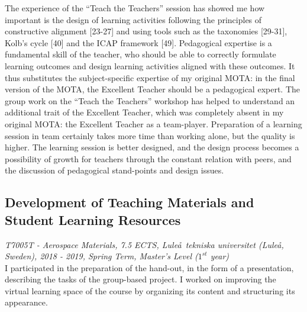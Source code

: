 \documentclass[
  a4paper, 
]{fortysecondscv}
\begin{document}
The experience of the “Teach the Teachers” session has showed me how important is the design of learning activities following the principles of constructive alignment [23-27] and using tools such as the taxonomies [29-31], Kolb’s cycle [40] and the ICAP framework [49]. Pedagogical expertise is a fundamental skill of the teacher, who should be able to correctly formulate learning outcomes and design learning activities aligned with these outcomes. It thus substitutes the subject-specific expertise of my original MOTA: in the final version of the MOTA, the Excellent Teacher should be a pedagogical expert. The group work on the “Teach the Teachers” workshop has helped to understand an additional trait of the Excellent Teacher, which was completely absent in my original MOTA: the Excellent Teacher as a team-player. Preparation of a learning session in team certainly takes more time than working alone, but the quality is higher. The learning session is better designed, and the design process becomes a possibility of growth for teachers through the constant relation with peers, and the discussion of pedagogical stand-points and design issues.

\newpage
\makebacksidebar
\hrulefill\hspace{5pt}\textbf{\thepage}

\subsection{Development of Teaching Materials and Student Learning Resources}
\textit{T7005T - Aerospace Materials, 7.5 ECTS, Lule\aa\ tekniska universitet (Lule\aa, Sweden), 2018 - 2019, Spring Term, Master's Level ($1^{st}$ year)}\\
I participated in the preparation of the hand-out, in the form of a presentation, describing the tasks of the group-based project. I worked on improving the virtual learning space of the course by organizing its content and structuring its appearance.
\end{document}
